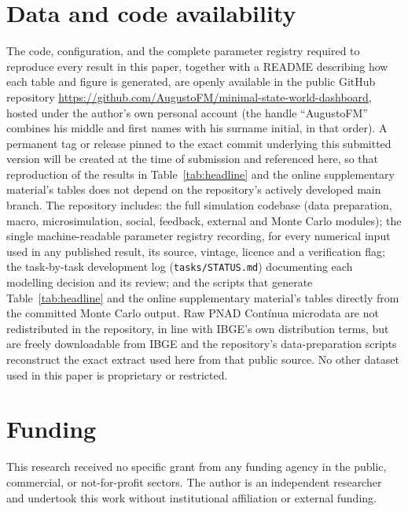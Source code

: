 \documentclass[11pt,a4paper]{article}
\begin{document}
\section*{Data and code availability}
The code, configuration, and the complete parameter registry required to reproduce every result in this paper, together with a README describing how each table and figure is generated, are openly available in the public GitHub repository \url{https://github.com/AugustoFM/minimal-state-world-dashboard}, hosted under the author's own personal account (the handle ``AugustoFM'' combines his middle and first names with his surname initial, in that order). A permanent tag or release pinned to the exact commit underlying this submitted version will be created at the time of submission and referenced here, so that reproduction of the results in Table~\ref{tab:headline} and the online supplementary material's tables does not depend on the repository's actively developed main branch. The repository includes: the full simulation codebase (data preparation, macro, microsimulation, social, feedback, external and Monte Carlo modules); the single machine-readable parameter registry recording, for every numerical input used in any published result, its source, vintage, licence and a verification flag; the task-by-task development log (\texttt{tasks/STATUS.md}) documenting each modelling decision and its review; and the scripts that generate Table~\ref{tab:headline} and the online supplementary material's tables directly from the committed Monte Carlo output. Raw PNAD Cont\'inua microdata are not redistributed in the repository, in line with IBGE's own distribution terms, but are freely downloadable from IBGE and the repository's data-preparation scripts reconstruct the exact extract used here from that public source. No other dataset used in this paper is proprietary or restricted.

\section*{Funding}
This research received no specific grant from any funding agency in the public, commercial, or not-for-profit sectors. The author is an independent researcher and undertook this work without institutional affiliation or external funding.
\end{document}
